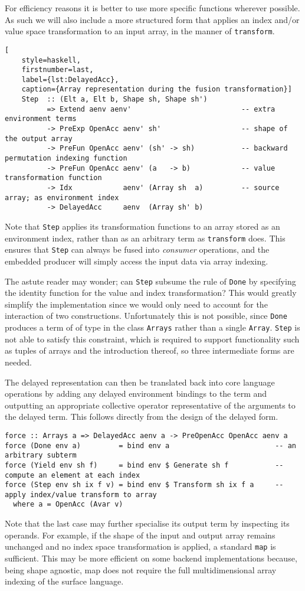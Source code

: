 %
For efficiency reasons it is better to use more specific functions wherever
possible. As such we will also include a more structured form that applies an
index and/or value space transformation to an input array, in the manner of
\texttt{transform}.
%
\begin{lstlisting}[
    style=haskell,
    firstnumber=last,
    label={lst:DelayedAcc},
    caption={Array representation during the fusion transformation}]
    Step  :: (Elt a, Elt b, Shape sh, Shape sh')
          => Extend aenv aenv'                          -- extra environment terms
          -> PreExp OpenAcc aenv' sh'                   -- shape of the output array
          -> PreFun OpenAcc aenv' (sh' -> sh)           -- backward permutation indexing function
          -> PreFun OpenAcc aenv' (a   -> b)            -- value transformation function
          -> Idx            aenv' (Array sh  a)         -- source array; as environment index
          -> DelayedAcc     aenv  (Array sh' b)
\end{lstlisting}
%
Note that \texttt{Step} applies its transformation functions to an array stored
as an environment index, rather than as an arbitrary term as \texttt{transform}
does. This ensures that \texttt{Step} can always be fused into \emph{consumer}
operations, and the embedded producer will simply access the input data via
array indexing.

The astute reader may wonder; can \texttt{Step} subsume the rule of
\texttt{Done} by specifying the identity function for the value and index
transformation? This would greatly simplify the implementation since we would
only need to account for the interaction of two constructions. Unfortunately
this is not possible, since \texttt{Done} produces a term of of type in the
class \texttt{Arrays} rather than a single \texttt{Array}. \texttt{Step} is not
able to satisfy this constraint, which is required to support functionality such
as tuples of arrays and the introduction thereof, so three intermediate forms
are needed.

The delayed representation can then be translated back into core language
operations by adding any delayed environment bindings to the term and outputting
an appropriate collective operator representative of the arguments to the
delayed term. This follows directly from the design of the delayed form.
%
\begin{lstlisting}[style=haskell]
force :: Arrays a => DelayedAcc aenv a -> PreOpenAcc OpenAcc aenv a
force (Done env a)         = bind env a                         -- an arbitrary subterm
force (Yield env sh f)     = bind env $ Generate sh f           -- compute an element at each index
force (Step env sh ix f v) = bind env $ Transform sh ix f a     -- apply index/value transform to array
  where a = OpenAcc (Avar v)
\end{lstlisting}
%
Note that the last case may further specialise its output term by inspecting its
operands. For example, if the shape of the input and output array remains
unchanged and no index space transformation is applied, a standard \texttt{map}
is sufficient. This may be more efficient on some backend implementations
because, being shape agnostic, map does not require the full multidimensional
array indexing of the surface language.

